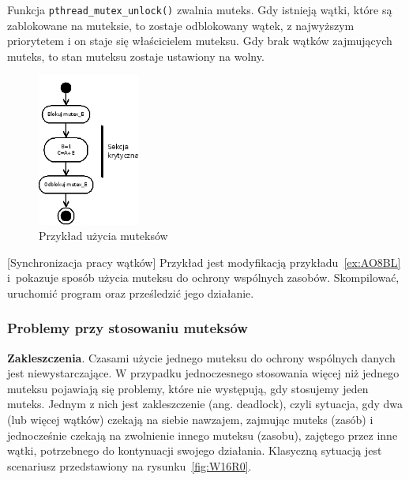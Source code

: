Funkcja \lstinline[style=MyCStyle]{pthread_mutex_unlock()} zwalnia muteks. Gdy istnieją wątki, które są zablokowane na muteksie, to zostaje odblokowany wątek, z najwyższym priorytetem i on staje się właścicielem muteksu. Gdy brak wątków zajmujących muteks, to stan muteksu zostaje ustawiony na wolny.

\begin{figure}[!h]
\centering
\includegraphics[width=0.3\textwidth]{img/thrd_mutex}
\caption{Przykład użycia muteksów}
\label{fig:GMVES}
\end{figure}

\begin{example}{[Synchronizacja pracy wątków]}
Przykład jest modyfikacją przykładu~\ref{ex:AO8BL} i~pokazuje sposób użycia muteksu do ochrony wspólnych zasobów. Skompilować, uruchomić program oraz prześledzić jego działanie.



\end{example}

\subsubsection{Problemy przy stosowaniu muteksów}

\textbf{Zakleszczenia}. Czasami użycie jednego muteksu do ochrony wspólnych danych jest niewystarczające. W przypadku jednoczesnego stosowania więcej niż jednego muteksu pojawiają się problemy, które nie występują, gdy stosujemy jeden muteks. Jednym z nich jest zakleszczenie (ang. deadlock), czyli sytuacja, gdy dwa (lub więcej wątków) czekają na siebie nawzajem, zajmując muteks (zasób) i jednocześnie czekają na zwolnienie innego muteksu (zasobu), zajętego przez inne wątki, potrzebnego do kontynuacji swojego działania. Klasyczną sytuacją jest scenariusz przedstawiony na rysunku~\ref{fig:W16R0}.

